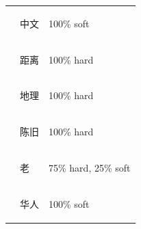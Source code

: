 \documentclass[smallextended,natbib]{svjour3}       %
\begin{document}
\begin{table}[ht]
{\begin{tabular}{|c|l|l|}
       & \begin{CJK}{UTF8}{gbsn}中文\end{CJK}  & 100\% soft                           \\ \cline{2-3} 
       & \begin{CJK}{UTF8}{gbsn}距离\end{CJK}  & 100\% hard                           \\ \cline{2-3} 
       & \begin{CJK}{UTF8}{gbsn}地理\end{CJK}  & 100\% hard                           \\ \cline{2-3} 
       & \begin{CJK}{UTF8}{gbsn}陈旧\end{CJK}  & 100\% hard                           \\ \cline{2-3} 
       & \begin{CJK}{UTF8}{gbsn}老\end{CJK}   & 75\% hard, 25\% soft                 \\ \cline{2-3} 
       & \begin{CJK}{UTF8}{gbsn}华人\end{CJK}  & 100\% soft                           \\ \hline
      \end{tabular}%
      }
  \end{table}
\end{document}
